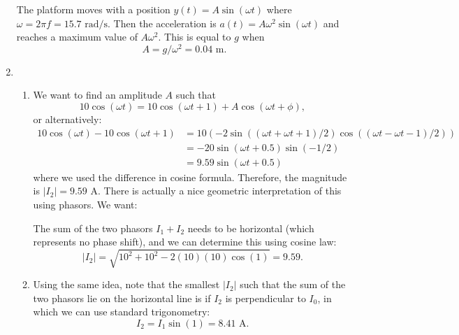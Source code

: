 \documentclass{article}
\begin{document}
\begin{enumerate}
    The platform moves with a position $y(t) = A\sin(\omega t)$ where $\omega = 2\pi f = 15.7 \text{ rad/s}.$ Then the acceleration is $a(t) = A\omega^2\sin(\omega t)$ and reaches a maximum value of $A\omega^2.$ This is equal to $g$ when $$\boxed{A = g/\omega^2 = 0.04\text{ m}}.$$
    \item \begin{enumerate}
        \item We want to find an amplitude $A$ such that
        \begin{equation}
            10\cos(\omega t) = 10\cos(\omega t+ 1) + A\cos(\omega t + \phi),
        \end{equation}
        or alternatively:
        \begin{align*}
            10\cos(\omega t) - 10\cos(\omega t+ 1)  &= 10 \left(-2\sin\left((\omega t + \omega t + 1)/2\right)\cos\left((\omega t - \omega t - 1)/2\right)\right) \\ 
            &= -20\sin(\omega t + 0.5)\sin(-1/2) \\ 
            &= 9.59\sin(\omega t + 0.5)
        \end{align*}
        where we used the difference in cosine formula. Therefore, the magnitude is $\boxed{|I_2|=9.59\text{ A}}$. There is actually a nice geometric interpretation of this using phasors. We want:
        \begin{center}
        \end{center}
        The sum of the two phasors $I_1+I_2$ needs to be horizontal (which represents no phase shift), and we can determine this using cosine law: 
        \begin{equation}
            |I_2| = \sqrt{10^2+10^2-2(10)(10)\cos(1)} = 9.59.
        \end{equation}
        \item Using the same idea, note that the smallest $|I_2|$ such that the sum of the two phasors lie on the horizontal line is if $I_2$ is perpendicular to $I_0$, in which we can use standard trigonometry: 
        \begin{equation}
            \boxed{I_2 = I_1\sin(1) = 8.41 \text{ A}}.

\end{equation}
\end{enumerate}
\end{enumerate}
\end{document}
